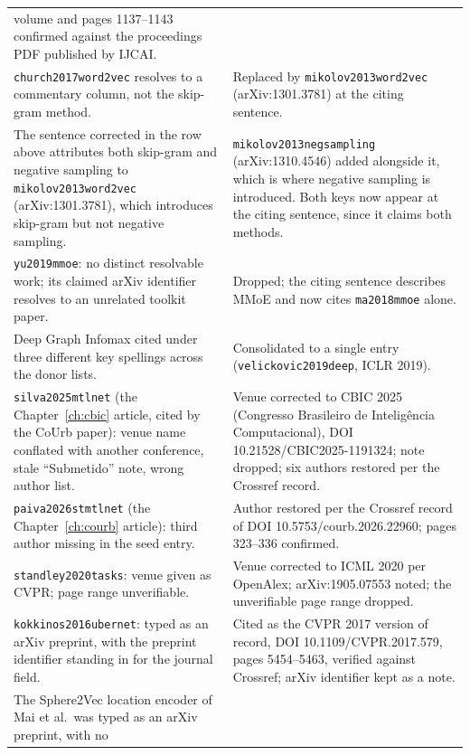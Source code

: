 {\begin{longtable}{@{}p{}p{}@{}}
volume and pages 1137--1143 confirmed against the proceedings PDF published by IJCAI. \\
\addlinespace
\texttt{church2017word2vec} resolves to a commentary column, not the skip-gram
method. &
Replaced by \texttt{mikolov2013word2vec} (arXiv:1301.3781) at the citing sentence. \\
\addlinespace
The sentence corrected in the row above attributes both skip-gram and negative sampling to
\texttt{mikolov2013word2vec} (arXiv:1301.3781), which introduces skip-gram but not negative
sampling. &
\texttt{mikolov2013negsampling} (arXiv:1310.4546) added alongside it, which is where negative
sampling is introduced. Both keys now appear at the citing sentence, since it claims both
methods. \\
\addlinespace
\texttt{yu2019mmoe}: no distinct resolvable work; its claimed arXiv identifier
resolves to an unrelated toolkit paper. &
Dropped; the citing sentence describes MMoE and now cites \texttt{ma2018mmoe} alone. \\
\addlinespace
Deep Graph Infomax cited under three different key spellings across the donor
lists. &
Consolidated to a single entry (\texttt{velickovic2019deep}, ICLR 2019). \\
\addlinespace
\texttt{silva2025mtlnet} (the Chapter~\ref{ch:cbic} article, cited by the CoUrb
paper): venue name conflated with another conference, stale ``Submetido''
note, wrong author list. &
Venue corrected to CBIC 2025 (Congresso Brasileiro de Intelig\^encia Computacional),
DOI 10.21528/CBIC2025-1191324; note dropped; six authors restored per the Crossref
record. \\
\addlinespace
\texttt{paiva2026stmtlnet} (the Chapter~\ref{ch:courb} article): third author
missing in the seed entry. &
Author restored per the Crossref record of DOI 10.5753/courb.2026.22960; pages
323--336 confirmed. \\
\addlinespace
\texttt{standley2020tasks}: venue given as CVPR; page range unverifiable. &
Venue corrected to ICML 2020 per OpenAlex; arXiv:1905.07553 noted; the unverifiable
page range dropped. \\
\addlinespace
\texttt{kokkinos2016ubernet}: typed as an arXiv preprint, with the preprint identifier
standing in for the journal field. &
Cited as the CVPR 2017 version of record, DOI 10.1109/CVPR.2017.579, pages
5454--5463, verified against Crossref; arXiv identifier kept as a note. \\
\addlinespace
The Sphere2Vec location encoder of Mai et al.\ was typed as an arXiv preprint, with no

\end{longtable}}
